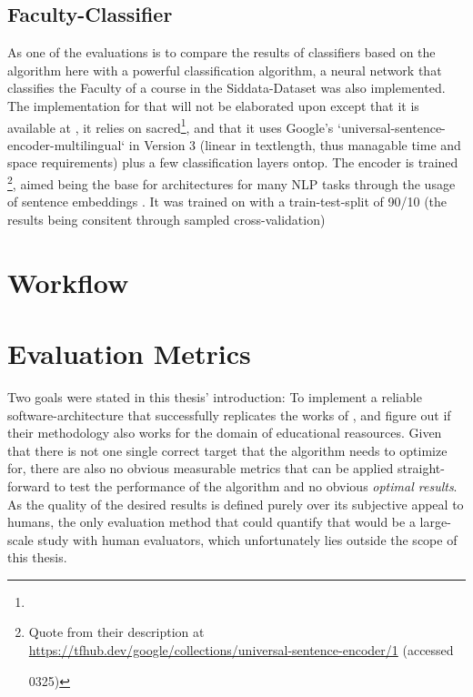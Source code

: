 

\subsection*{Faculty-Classifier}
\label{sec:faculty_classifier}

As one of the evaluations is to compare the results of classifiers based on the algorithm here with a powerful classification algorithm, a neural network that classifies the Faculty of a course in the Siddata-Dataset was also implemented. The implementation for that will not be elaborated upon except that it is available at , it relies on sacred\footnote{}, and that it uses Google's `universal-sentence-encoder-multilingual` in Version 3 (linear in textlength, thus managable time and space requirements) plus a few classification layers ontop. The encoder is trained \footnote{Quote from their description at \url{https://tfhub.dev/google/collections/universal-sentence-encoder/1} (accessed \date{2022}{03}{25})}, aimed being the base for architectures for many NLP tasks through the usage of sentence embeddings \cite{Cer2018}. It was trained on with a train-test-split of 90/10 (the results being consitent through sampled cross-validation)



\section{Workflow}
\label{sec:workflow}





\section{Evaluation Metrics}
\label{sec:eval_metrics}

Two goals were stated in this thesis' introduction: To implement a reliable software-architecture that successfully replicates the works of \textcite{Derrac2015}, and figure out if their methodology also works for the domain of educational reasources. Given that there is not one single correct target that the algorithm needs to optimize for, there are also no obvious measurable metrics that can be applied straight-forward to test the performance of the algorithm and no obvious \textit{optimal results}. As the quality of the desired results is defined purely over its subjective appeal to humans, the only evaluation method that could quantify that would be a large-scale study with human evaluators, which unfortunately lies outside the scope of this thesis.

